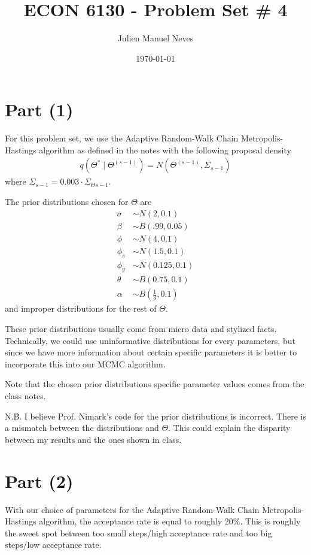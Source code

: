 \documentclass[12pt]{article}
\title{ECON 6130 - Problem Set \# 4}
\date{\today}
\author{Julien Manuel Neves}
\theoremstyle{definition}
\begin{document}
\maketitle

\section*{Part (1)}

For this problem set, we use the Adaptive Random-Walk Chain Metropolis-Hastings algorithm as defined in the notes with the following proposal density
\begin{align*}
	q(\Theta^*\mid \Theta^{(s-1)}) = N(\Theta^{(s-1)}, \Sigma_{s-1})
\end{align*}
where $\Sigma_{s-1}= 0.003 \cdot \Sigma_{\Theta s-1}$.

The prior distributions chosen for $\Theta$ are
\begin{align*}
	\sigma & \sim N(2,0.1)\\
	\beta & \sim B(.99,0.05)\\
	\phi & \sim N(4,0.1)\\
	\phi_{\pi} & \sim N(1.5,0.1)\\
	\phi_{y} & \sim N(0.125,0.1)\\
	\theta & \sim B(0.75,0.1)\\
	\alpha & \sim B\left( \frac{1}{3},0.1\right) 
\end{align*}
and improper distributions for the rest of $\Theta$.

These prior distributions usually come from micro data and stylized facts. Technically, we could use uninformative distributions for every parameters, but since we have more information about certain specific parameters it is better to incorporate this into our MCMC algorithm.

Note that the chosen prior distributions specific parameter values comes from the class notes.

N.B. I believe Prof. Nimark's code for the prior distributions is incorrect. There is a mismatch between the distributions and $\Theta$. This could explain the disparity between my results and the ones shown in class.


\section*{Part (2)}
With our choice of parameters for the Adaptive Random-Walk Chain Metropolis-Hastings algorithm, the acceptance rate is equal to roughly 20\%. This is roughly the sweet spot between too small steps/high acceptance rate and too big steps/low acceptance rate.
\end{document}
